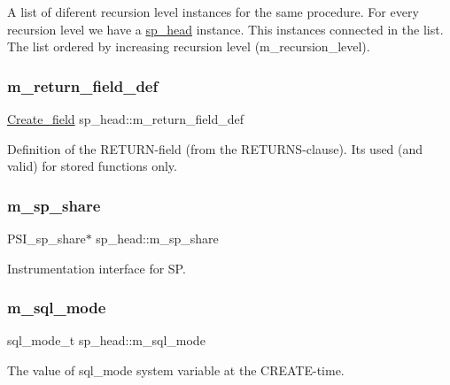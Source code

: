 A list of diferent recursion level instances for the same procedure. For every recursion level we have a \mbox{\hyperlink{classsp__head}{sp\+\_\+head}} instance. This instances connected in the list. The list ordered by increasing recursion level (m\+\_\+recursion\+\_\+level). \mbox{\label{classsp__head_a44ffe5b534816fc045d51ed4eb3af785}} 
\subsubsection{\texorpdfstring{m\+\_\+return\+\_\+field\+\_\+def}{m\_return\_field\_def}}
{\footnotesize\ttfamily \mbox{\hyperlink{classCreate__field}{Create\+\_\+field}} sp\+\_\+head\+::m\+\_\+return\+\_\+field\+\_\+def}

Definition of the R\+E\+T\+U\+RN-\/field (from the R\+E\+T\+U\+R\+NS-\/clause). It\textquotesingle{}s used (and valid) for stored functions only. \mbox{\label{classsp__head_abe1fa0b6ce7890d3f84c731be10c3863}} 
\subsubsection{\texorpdfstring{m\+\_\+sp\+\_\+share}{m\_sp\_share}}
{\footnotesize\ttfamily P\+S\+I\+\_\+sp\+\_\+share$\ast$ sp\+\_\+head\+::m\+\_\+sp\+\_\+share}

Instrumentation interface for SP. \mbox{\label{classsp__head_a9deb9606abdbc7358ed6f5917126058d}} 
\subsubsection{\texorpdfstring{m\+\_\+sql\+\_\+mode}{m\_sql\_mode}}
{\footnotesize\ttfamily sql\+\_\+mode\+\_\+t sp\+\_\+head\+::m\+\_\+sql\+\_\+mode}

The value of sql\+\_\+mode system variable at the C\+R\+E\+A\+TE-\/time.

